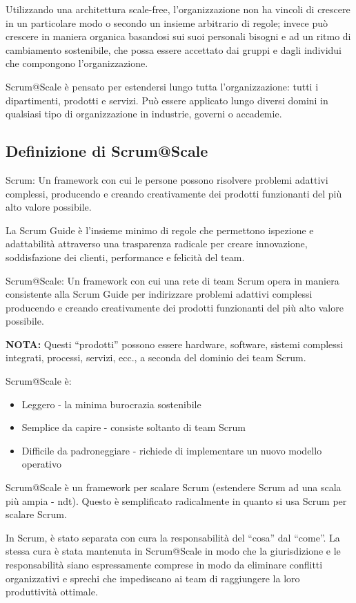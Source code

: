 \documentclass[12pt,a4paper,parskip=full]{scrartcl}
\begin{document}
Utilizzando una architettura scale-free, l'organizzazione non ha 
vincoli di crescere in un particolare modo o secondo un insieme arbitrario di
regole; invece può crescere in maniera organica basandosi sui suoi personali
bisogni e ad un ritmo di cambiamento sostenibile, che possa essere 
accettato dai gruppi e dagli individui che compongono l'organizzazione.

Scrum@Scale è pensato per estendersi lungo tutta l'organizzazione: tutti
i dipartimenti, prodotti e servizi. Può essere applicato lungo diversi domini
in qualsiasi tipo di organizzazione in industrie, governi o accademie.

\subsection{Definizione di Scrum@Scale}
Scrum: Un framework con cui le persone possono risolvere problemi adattivi complessi,
producendo e creando creativamente dei prodotti funzionanti del più alto valore possibile.

La Scrum Guide è l'insieme minimo di regole che permettono ispezione e adattabilità
attraverso una trasparenza radicale per creare innovazione, soddisfazione dei clienti,
performance e felicità del team.

Scrum@Scale: Un framework con cui una rete di team Scrum opera in maniera consistente
alla Scrum Guide per indirizzare problemi adattivi complessi producendo e creando creativamente dei prodotti funzionanti del più alto valore possibile.

\textbf{NOTA:} Questi ``prodotti'' possono essere hardware, software, sistemi complessi integrati, processi, servizi, ecc., a seconda del dominio dei team Scrum.

Scrum@Scale è:
\begin{itemize}
\item Leggero - la minima burocrazia sostenibile
\item Semplice da capire - consiste soltanto di team Scrum
\item Difficile da padroneggiare - richiede di implementare un nuovo modello operativo
\end{itemize}

Scrum@Scale è un framework per scalare Scrum (estendere Scrum ad una scala più ampia - ndt). Questo è semplificato radicalmente in quanto si usa Scrum per scalare Scrum.

In Scrum, è stato separata con cura la responsabilità del ``cosa'' dal ``come''.
La stessa cura è stata mantenuta in Scrum@Scale in modo che la giurisdizione e le responsabilità siano espressamente comprese in modo da eliminare conflitti organizzativi e sprechi che impediscano ai team di raggiungere la loro produttività ottimale.
\end{document}

